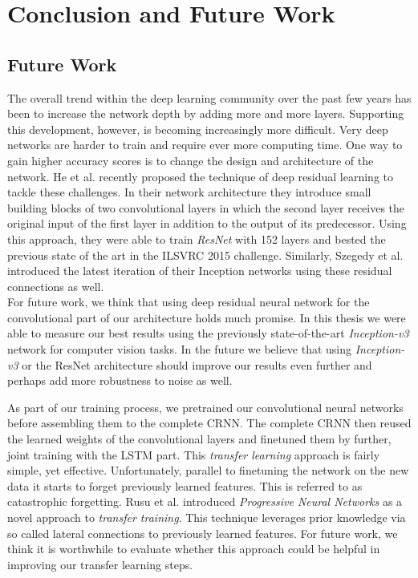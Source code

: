\section{Conclusion and Future Work}
\label{sec:summary}

\subsection{Future Work}
The overall trend within the deep learning community over the past few years has been to increase the network depth by adding more and more layers. Supporting this development, however, is becoming increasingly more difficult. Very deep networks are harder to train and require ever more computing time. One way to gain higher accuracy scores is to change the design and architecture of the network. He et al. recently proposed the technique of deep residual learning\cite{he2016deep} to tackle these challenges. In their network architecture they introduce small building blocks of two convolutional layers in which the second layer receives the original input of the first layer in addition to the output of its predecessor. \cite{he2016deep} Using this approach, they were able to train \emph{ResNet} with 152 layers and bested the previous state of the art in the ILSVRC 2015 challenge. Similarly, Szegedy et al. introduced the latest iteration of their Inception networks using these residual connections\cite{szegedy2016inception} as well.\\
For future work, we think that using deep residual neural network for the convolutional part of our architecture holds much promise. In this thesis we were able to measure our best results using the previously state-of-the-art \emph{Inception-v3} network for computer vision tasks. In the future we believe that using \emph{Inception-v3} or the ResNet architecture should improve our results even further and perhaps add more robustness to noise as well.

As part of our training process, we pretrained our convolutional neural networks before assembling them to the complete CRNN. The complete CRNN then reused the learned weights of the convolutional layers and finetuned them by further, joint training with the LSTM part. This \emph{transfer learning} approach is fairly simple, yet effective. Unfortunately, parallel to finetuning the network on the new data it starts to forget previously learned features. This is referred to as catastrophic forgetting. Rusu et al. introduced \emph{Progressive Neural Networks}\cite{rusu2016progressive} as a novel approach to \emph{transfer training}. This technique leverages prior knowledge via so called lateral connections to previously learned features. For future work, we think it is worthwhile to evaluate whether this approach could be helpful in improving our transfer learning steps.

